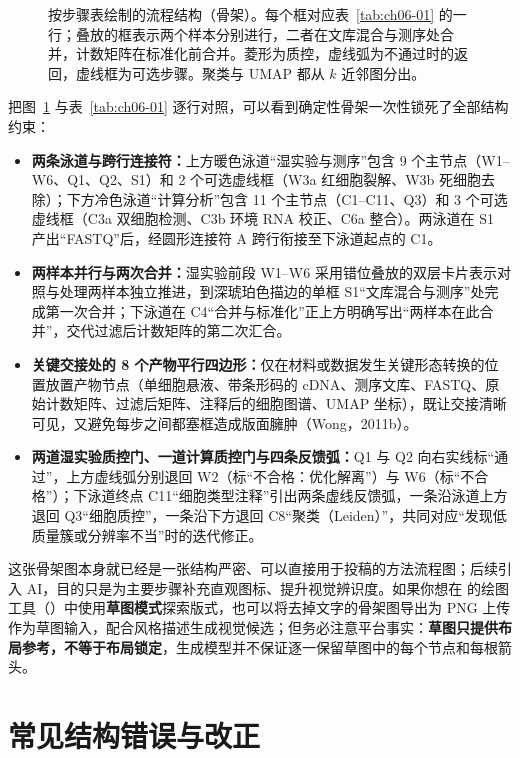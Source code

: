 \begin{figure}[htbp]\centering
\resizebox{\linewidth}{!}{}
\caption{按步骤表绘制的流程结构（骨架）。每个框对应表~\ref{tab:ch06-01} 的一行；叠放的框表示两个样本分别进行，二者在文库混合与测序处合并，计数矩阵在标准化前合并。菱形为质控，虚线弧为不通过时的返回，虚线框为可选步骤。聚类与 UMAP 都从 $k$ 近邻图分出。}\label{fig:ch06-03}
\end{figure}

把图~\ref{fig:ch06-03} 与表~\ref{tab:ch06-01} 逐行对照，可以看到确定性骨架一次性锁死了全部结构约束：
\begin{itemize}
\item \textbf{两条泳道与跨行连接符：}上方暖色泳道“湿实验与测序”包含 9 个主节点（W1–W6、Q1、Q2、S1）和 2 个可选虚线框（W3a 红细胞裂解、W3b 死细胞去除）；下方冷色泳道“计算分析”包含 11 个主节点（C1–C11、Q3）和 3 个可选虚线框（C3a 双细胞检测、C3b 环境 RNA 校正、C6a 整合）。两泳道在 S1 产出“FASTQ”后，经圆形连接符 A 跨行衔接至下泳道起点的 C1。
\item \textbf{两样本并行与两次合并：}湿实验前段 W1–W6 采用错位叠放的双层卡片表示对照与处理两样本独立推进，到深琥珀色描边的单框 S1“文库混合与测序”处完成第一次合并；下泳道在 C4“合并与标准化”正上方明确写出“两样本在此合并”，交代过滤后计数矩阵的第二次汇合。
\item \textbf{关键交接处的 8 个产物平行四边形：}仅在材料或数据发生关键形态转换的位置放置产物节点（单细胞悬液、带条形码的 cDNA、测序文库、FASTQ、原始计数矩阵、过滤后矩阵、注释后的细胞图谱、UMAP 坐标），既让交接清晰可见，又避免每步之间都塞框造成版面臃肿（Wong，2011b）。
\item \textbf{两道湿实验质控门、一道计算质控门与四条反馈弧：}Q1 与 Q2 向右实线标“通过”，上方虚线弧分别退回 W2（标“不合格：优化解离”）与 W6（标“不合格”）；下泳道终点 C11“细胞类型注释”引出两条虚线反馈弧，一条沿泳道上方退回 Q3“细胞质控”，一条沿下方退回 C8“聚类（Leiden）”，共同对应“发现低质量簇或分辨率不当”时的迭代修正。
\end{itemize}

这张骨架图本身就已经是一张结构严密、可以直接用于投稿的方法流程图；后续引入 AI，目的只是为主要步骤补充直观图标、提升视觉辨识度。如果你想在 \scidraw{} 的绘图工具（）中使用\textbf{草图模式}探索版式，也可以将去掉文字的骨架图导出为 PNG 上传作为草图输入，配合风格描述生成视觉候选；但务必注意平台事实：\textbf{草图只提供布局参考，不等于布局锁定}，生成模型并不保证逐一保留草图中的每个节点和每根箭头。

\section{常见结构错误与改正}

